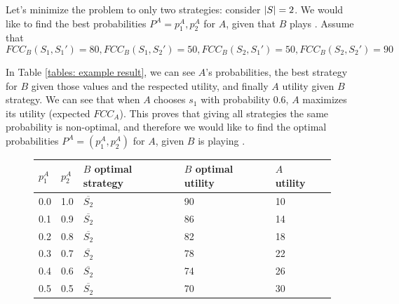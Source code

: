 \documentclass[a4paper,10pt]{article}
\newcommand{\fcc}{\ensuremath{FCC}\xspace}
\DeclarePairedDelimiter\abs{\lvert}{\rvert}%
\begin{document}
Let's minimize the problem to only two strategies: consider $\abs{S}=2$. We would like to find the best probabilities $P^A=p_1^A,p_2^A$ for $A$, given that $B$ plays \crbs. Assume that \[\fcc_B(S_1,S_1')=80, \fcc_B(S_1,S_2')=50, \fcc_B(S_2,S_1')=50,\fcc_B(S_2,S_2')=90\]

In Table \ref{tables: example result}, we can see $A$'s probabilities, the best strategy for $B$ given those values and the respected utility, and finally $A$ utility given $B$ strategy.
We can see that when $A$ chooses $s_1$ with probability 0.6, $A$ maximizes its utility (expected $\fcc_A$). This proves that giving all strategies the same probability is non-optimal, and therefore we would like to find the optimal probabilities $P^A=(p_1^A,p_2^A)$ for $A$, given $B$ is playing \crbs.

\begin{figure}[H]
\centering
\begin{tabular}{llllll}
\hline
{$p_1^A$} & 
{$p_2^A$} & {$B$ optimal strategy} & {$B$ optimal utility} & {$A$ utility} &  \\ \hline
\multicolumn{1}{|l|}{0.0}             & \multicolumn{1}{l|}{1.0}              & \multicolumn{1}{l|}{$\overline{S_2}$}            & \multicolumn{1}{l|}{90}                         & \multicolumn{1}{l|}{10}                 &  \\ \cline{1-5}
\multicolumn{1}{|l|}{0.1}             & \multicolumn{1}{l|}{0.9}              & \multicolumn{1}{l|}{$\overline{S_2}$}            & \multicolumn{1}{l|}{86}                         & \multicolumn{1}{l|}{14}                 &  \\ \cline{1-5}
\multicolumn{1}{|l|}{0.2}             & \multicolumn{1}{l|}{0.8}              & \multicolumn{1}{l|}{$\overline{S_2}$}            & \multicolumn{1}{l|}{82}                         & \multicolumn{1}{l|}{18}                 &  \\ \cline{1-5}
\multicolumn{1}{|l|}{0.3}             & \multicolumn{1}{l|}{0.7}              & \multicolumn{1}{l|}{$\overline{S_2}$}            & \multicolumn{1}{l|}{78}                         & \multicolumn{1}{l|}{22}                 &  \\ \cline{1-5}
\multicolumn{1}{|l|}{0.4}             & \multicolumn{1}{l|}{0.6}              & \multicolumn{1}{l|}{$\overline{S_2}$}            & \multicolumn{1}{l|}{74}                         & \multicolumn{1}{l|}{26}                 &  \\ \cline{1-5}
\multicolumn{1}{|l|}{0.5}             & \multicolumn{1}{l|}{0.5}              & \multicolumn{1}{l|}{$\overline{S_2}$}            & \multicolumn{1}{l|}{70}                         & \multicolumn{1}{l|}{30}                 &  \\ \cline{1-5}

\end{tabular}
\end{figure}
\end{document}
